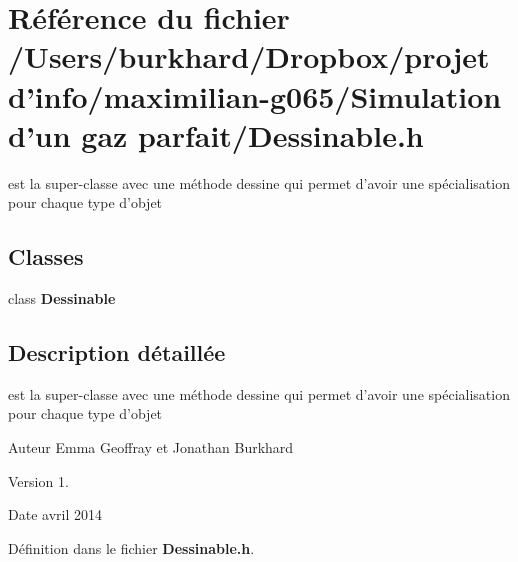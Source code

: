 \section{Référence du fichier /\+Users/burkhard/\+Dropbox/projet d'info/maximilian-\/g065/\+Simulation d'un gaz parfait/\+Dessinable.h}
\label{_dessinable_8h}


est la super-\/classe avec une méthode dessine qui permet d'avoir une spécialisation pour chaque type d'objet  


\subsection*{Classes}
\begin{DoxyCompactItemize}
\item 
class {\bf Dessinable}
\end{DoxyCompactItemize}


\subsection{Description détaillée}
est la super-\/classe avec une méthode dessine qui permet d'avoir une spécialisation pour chaque type d'objet 

\begin{DoxyAuthor}{Auteur}
Emma Geoffray et Jonathan Burkhard 
\end{DoxyAuthor}
\begin{DoxyVersion}{Version}
1. 
\end{DoxyVersion}
\begin{DoxyDate}{Date}
avril 2014 
\end{DoxyDate}


Définition dans le fichier {\bf Dessinable.\+h}.

